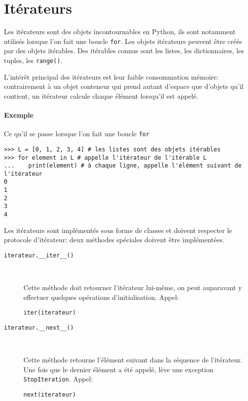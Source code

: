 \section{Itérateurs}\label{iterateur}

Les itérateurs sont des objets incontournables en Python, ils sont notamment utilisés lorsque l'on fait une boucle \texttt{for}. Les objets itérateurs peuvent être créés par des objets itérables. Des itérables connus sont les listes, les dictionnaires, les tuples, les \texttt{range()}.\bigskip

L'intérêt principal des itérateurs est leur faible consommation mémoire: contrairement à un objet conteneur qui prend autant d'espace que d'objets qu'il contient, un itérateur calcule chaque élément lorsqu'il est appelé.

\paragraph{Exemple} Ce qu'il se passe lorsque l'on fait une boucle \texttt{for}
\begin{verbatim}
>>> L = [0, 1, 2, 3, 4] # les listes sont des objets itérables
>>> for element in L # appelle l'itérateur de l'itérable L
...    print(element) # à chaque ligne, appelle l'élément suivant de l'itérateur
0
1
2
3
4
\end{verbatim}

Les itérateurs sont implémentés sous forme de classes et doivent respecter le protocole d'itérateur: deux méthodes spéciales doivent être implémentées.
\begin{description}
    \item[\texttt{iterateur.__iter__()}]~

    Cette méthode doit retourner l'itérateur lui-même, on peut auparavant y effectuer quelques opérations d’initialisation. Appel:
    \begin{verbatim}
iter(iterateur)
    \end{verbatim}

    \item[\texttt{iterateur.__next__()}]~

    Cette méthode retourne l'élément suivant dans la séquence de l'itérateur. Une fois que le dernier élément a été appelé, lève une exception \texttt{StopIteration}. Appel:
    \begin{verbatim}
next(iterateur)
    \end{verbatim}
\end{description}

